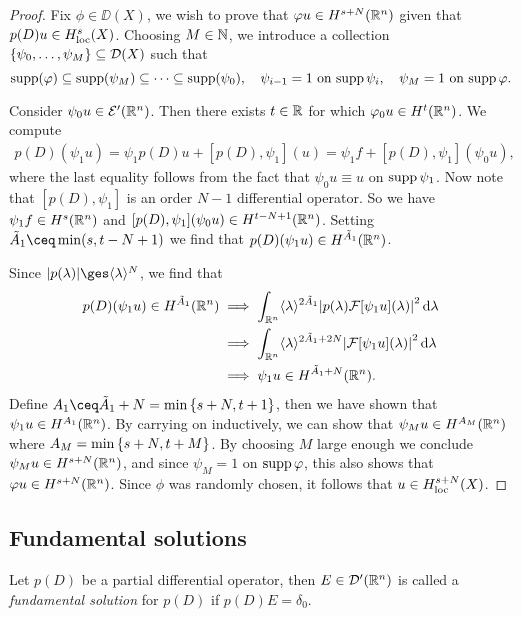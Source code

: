 \begin{proof}
	Fix $\phi \in \DD(X)$, we wish to prove that $\varphi u \in H^{s + N}(\mathbb R^n)$ given that $p(D) u \in H^s_\mathrm{loc}(X)$.  Choosing $M \in \mathbb N$, we introduce a collection $\qty{\psi_0, \dotsc, \psi_M} \subseteq \mathcal D(X)$ such that
	\[
	\operatorname{supp}(\varphi) \subseteq \operatorname{supp}(\psi_M) \subseteq \dotsb \subseteq \operatorname{supp}(\psi_0), \quad \psi_{i-1} = 1 \text{ on $\operatorname{supp} \psi_i$}, \quad \psi_M = 1 \text{ on $\operatorname{supp}\varphi$}. 
	\]
	
	Consider $\psi_0 u \in \mathcal E'(\mathbb R^n)$. Then there exists $t \in \mathbb R$ for which $\varphi_0 u \in H^t(\mathbb R^n)$. We compute
	\begin{align*}
		p(D)(\psi_1 u) = \psi_1 p(D) u + [p(D), \psi_1](u) = \psi_1 f + [p(D), \psi_1](\psi_0 u),
	\end{align*}
where the last equality follows from the fact that $\psi_0 u \equiv u$ on $\operatorname{supp} \psi_1$. Now note that $[p(D), \psi_1]$ is an order $N-1$ differential operator. So we have $\psi_1 f \in H^s(\mathbb R^n)$ and $[p(D), \psi_1](\psi_0 u) \in H^{t - N + 1}(\mathbb R^n)$.
Setting $\tilde A_1 \ceq \min(s, t - N + 1)$ we find that $p(D)(\psi_1 u) \in H^{\tilde A_1}(\mathbb R^n)$. 

Since $\abs{p(\lambda)} \ges \ang{\lambda}^N$, we find that
\begin{align*}
p(D)(\psi_1 u) \in H^{\tilde A_1}(\mathbb R^n) &\implies \int_{\mathbb R^n} \langle\lambda\rangle^{2 \tilde A_1} \abs{p(\lambda) \mathcal F[\psi_1u](\lambda)}^2 \dd{\lambda} \\
&\implies \int_{\mathbb R^n} \langle\lambda\rangle^{2\tilde A_1 + 2N} \abs{\mathcal F[\psi_1 u](\lambda)}^2 \dd{\lambda} \\
&\implies \psi_1 u \in H^{\tilde A_1 + N}(\mathbb R^n).
\end{align*}
Define $A_1 \ceq \tilde A_1 + N = \min\qty{s + N, t + 1}$, then we have shown that $\psi_1 u \in H^{A_1}(\mathbb R^n)$. By carrying on inductively, we can show that $\psi_M u \in H^{A_M}(\mathbb R^n)$ where $A_M = \min\qty{s + N, t + M}$. By choosing $M$ large enough we conclude $\psi_M u \in H^{s + N}(\mathbb R^n)$, and since $\psi_M = 1$ on $\operatorname{supp}\varphi$, this also shows that $\varphi u \in H^{s + N}(\mathbb R^n)$. Since $\phi$ was randomly chosen, it follows that $u \in H^{s+N}_\mathrm{loc}(X)$.  
\end{proof}

\subsection{Fundamental solutions}
\begin{definition}
	Let $p(D)$ be a partial differential operator, then $E \in \mathcal D'(\mathbb R^n)$ is called a \emph{fundamental solution} for $p(D)$ if $p(D)E = \delta_0$. 
\end{definition}

